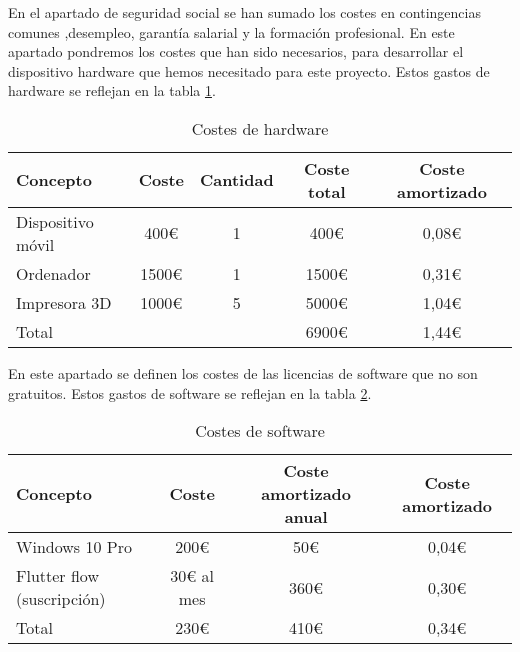             En el apartado de seguridad social se han sumado los costes en contingencias comunes ,desempleo, garantía salarial y la formación profesional.
            En este apartado pondremos los costes que han sido necesarios, para desarrollar el dispositivo hardware que hemos necesitado para este proyecto. Estos gastos de hardware se reflejan en la tabla \ref{tab:costes de hardware de plan de negocio}.
            \begin{table}[H]
                \centering
                \caption{Costes de hardware}
                \begin{tabular}{|l|c|c|c|c|}
                    \hline
                    Concepto & Coste & Cantidad & Coste total & Coste amortizado \\
                    \hline
                    Dispositivo móvil & 400€ & 1 & 400€ & 0,08€ \\
                    Ordenador & 1500€ & 1 & 1500€ & 0,31€ \\
                    Impresora 3D & 1000€ & 5 & 5000€ & 1,04€ \\
                    \hline
                    Total & & & 6900€ & 1,44€ \\
                    \hline
                \end{tabular}
                \label{tab:costes de hardware de plan de negocio}
            \end{table}
            En este apartado se definen los costes de las licencias de software que no son gratuitos. Estos gastos de software se reflejan en la tabla \ref{tab:costes de software de plan de negocio}.
            \begin{table}[H]
                \centering
                \caption{Costes de software}
                \begin{tabular}{|l|c|c|c|}
                    \hline
                    Concepto & Coste & Coste amortizado anual & Coste amortizado \\
                    \hline
                    Windows 10 Pro & 200€ & 50€ & 0,04€ \\
                    Flutter flow (suscripción) & 30€ al mes & 360€ & 0,30€ \\
                    \hline
                    Total & 230€ & 410€ & 0,34€ \\
                    \hline
                \end{tabular}
                \label{tab:costes de software de plan de negocio}
            \end{table}

